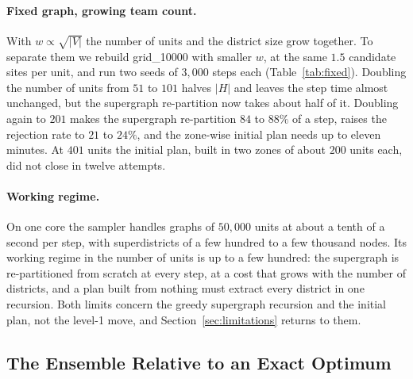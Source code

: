 \documentclass[11pt]{article}
\theoremstyle{definition}
\begin{document}
\paragraph{Fixed graph, growing team count.}
With $w \propto \sqrt{|V|}$ the number of units and the district size grow together. To separate them we rebuild grid\_10000 with smaller $w$, at the same $1.5$ candidate sites per unit, and run two seeds of $3{,}000$ steps each (Table~\ref{tab:fixed}). Doubling the number of units from $51$ to $101$ halves $|H|$ and leaves the step time almost unchanged, but the supergraph re-partition now takes about half of it. Doubling again to $201$ makes the supergraph re-partition $84$ to $88\%$ of a step, raises the rejection rate to $21$ to $24\%$, and the zone-wise initial plan needs up to eleven minutes. At $401$ units the initial plan, built in two zones of about $200$ units each, did not close in twelve attempts.

\begin{table}[!htbp]
\centering
\footnotesize\setlength{\tabcolsep}{4pt}

\caption{The $10{,}000$-node grid at a growing number of units $k$, two seeds of $3{,}000$ steps each (one chain of $10{,}000$ steps for $k=51$); ranges are over the seeds. ``Initial plan'' is the time of the zone-wise construction of the first plan.}
\label{tab:fixed}
\end{table}

\paragraph{Working regime.}
On one core the sampler handles graphs of $50{,}000$ units at about a tenth of a second per step, with superdistricts of a few hundred to a few thousand nodes. Its working regime in the number of units is up to a few hundred: the supergraph is re-partitioned from scratch at every step, at a cost that grows with the number of districts, and a plan built from nothing must extract every district in one recursion. Both limits concern the greedy supergraph recursion and the initial plan, not the level-1 move, and Section~\ref{sec:limitations} returns to them.

\subsection{The Ensemble Relative to an Exact Optimum}\label{sec:exp-milp}
\end{document}
